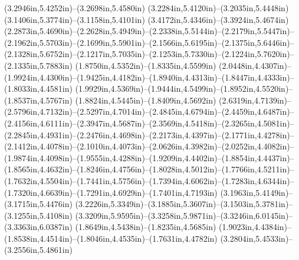 (3.2946in,5.4252in)--(3.2698in,5.4580in) (3.2284in,5.4120in)--(3.2035in,5.4448in) (3.1406in,5.3774in)--(3.1158in,5.4101in) (3.4172in,5.4346in)--(3.3924in,5.4674in) (2.2873in,5.4690in)--(2.2628in,5.4949in)--(2.2338in,5.5144in)--(2.2179in,5.5447in)--(2.1962in,5.5703in)--(2.1699in,5.5901in)--(2.1566in,5.6195in)--(2.1375in,5.6446in)--(2.1328in,5.6752in)--(2.1217in,5.7035in)--(2.1253in,5.7330in)--(2.1224in,5.7620in)--(2.1335in,5.7883in) (1.8750in,4.5352in)--(1.8335in,4.5599in) (2.0448in,4.4307in)--(1.9924in,4.4300in)--(1.9425in,4.4182in)--(1.8940in,4.4313in)--(1.8447in,4.4333in)--(1.8033in,4.4581in) (1.9929in,4.5369in)--(1.9444in,4.5499in)--(1.8952in,4.5520in)--(1.8537in,4.5767in) (1.8824in,4.5445in)--(1.8409in,4.5692in) (2.6319in,4.7139in)--(2.5796in,4.7132in)--(2.5297in,4.7014in)--(2.4845in,4.6794in)--(2.4459in,4.6487in)--(2.4156in,4.6111in)--(2.3947in,4.5687in)--(2.3569in,4.5418in)--(2.3265in,4.5081in)--(2.2845in,4.4931in)--(2.2476in,4.4698in)--(2.2173in,4.4397in)--(2.1771in,4.4278in)--(2.1412in,4.4078in)--(2.1010in,4.4073in)--(2.0626in,4.3982in)--(2.0252in,4.4082in)--(1.9874in,4.4098in)--(1.9555in,4.4288in)--(1.9209in,4.4402in)--(1.8854in,4.4437in)--(1.8565in,4.4632in)--(1.8246in,4.4756in)--(1.8028in,4.5012in)--(1.7766in,4.5211in)--(1.7632in,4.5504in)--(1.7441in,4.5756in)--(1.7394in,4.6062in)--(1.7283in,4.6344in)--(1.7320in,4.6639in)--(1.7291in,4.6929in)--(1.7401in,4.7193in) (3.1963in,5.4149in)--(3.1715in,5.4476in) (3.2226in,5.3349in)--(3.1885in,5.3607in)--(3.1503in,5.3781in)--(3.1255in,5.4108in) (3.3209in,5.9595in)--(3.3258in,5.9871in)--(3.3246in,6.0145in)--(3.3363in,6.0387in) (1.8649in,4.5438in)--(1.8235in,4.5685in) (1.9023in,4.4384in)--(1.8538in,4.4514in)--(1.8046in,4.4535in)--(1.7631in,4.4782in) (3.2804in,5.4533in)--(3.2556in,5.4861in)

